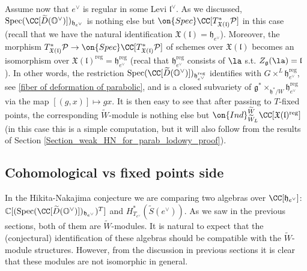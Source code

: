 \documentclass[12pt]{amsart}
\begin{document}
Assume now that $e^\vee$ is regular in some Levi $\mathfrak{l}^\vee$. As we discussed, $\operatorname{Spec}(\CC[\widetilde{D}(\mathbb{O}^\vee)])_{\mathfrak{h}_{e^\vee}}$ is nothing else but $\on{Spec}\CC[T^*_{\mathfrak{X}(\mathfrak{l})}\mathcal{P}]$ in this case (recall that we have the natural identification $\mathfrak{X}(\mathfrak{l})=\mathfrak{h}_{e^\vee}$). Moreover, the morphism $T^*_{\mathfrak{X}(\mathfrak{l})}\mathcal{P} \rightarrow \on{Spec}\CC[T^*_{\mathfrak{X}(\mathfrak{l})}\mathcal{P}]$ of schemes over $\mathfrak{X}(\mathfrak{l})$ becomes an isomorphism over $\mathfrak{X}(\mathfrak{l})^{\mathrm{reg}}=\mathfrak{h}_{e^\vee}^{\mathrm{reg}}$ (recal that $\mathfrak{h}_{e^\vee}^{\mathrm{reg}}$ consists of $\la$ s.t. $Z_{\mathfrak{g}}(\la)=\mathfrak{l}$). 
In other words, the restriction  $\operatorname{Spec}(\CC[\widetilde{D}(\mathbb{O}^\vee)])_{\mathfrak{h}_{e^\vee}^{\mathrm{reg}}}$ identifies with $G \times^L \mathfrak{h}_{e^\vee}^{\mathrm{reg}}$, see \cref{fiber of deformation of parabolic}, and is a closed subvariety of $\mathfrak{g}^* \times_{\mathfrak{h}^*/W} \mathfrak{h}_{e^\vee}^{\mathrm{reg}}$ via the map $[(g,x)] \mapsto gx$. It is then easy to see that after passing to $T$-fixed points, the corresponding $\widetilde{W}$-module is nothing else but $\on{Ind}_{\widetilde{W}_L}^{\widetilde{W}}\CC[\mathfrak{X}(\mathfrak{l})^{\mathrm{reg}}]$ (in this case this is a simple computation, but it will also follow from the results of Section \ref{Section_weak_HN_for_parab_lodowy_proof}).





\subsection{Cohomological vs fixed points side}
In the Hikita-Nakajima conjecture we are comparing two algebras over $\CC[\mathfrak{h}_{e^\vee}]$: $\mathbb{C}[(\operatorname{Spec}(\CC[\widetilde{D}(\mathbb{O}^\vee)])_{\mathfrak{h}_{e^\vee}})^{T}]$ and $H^*_{T_{e^\vee}}(\widetilde{S}(e^\vee))$. As we saw in the previous sections, both of them are $\widetilde{W}$-modules. It is natural to expect that the (conjectural) identification of these algebras should be compatible with the $\widetilde{W}$-module structures. However, from the discussion in previous sections it is clear that these modules are not isomorphic in general. 
\end{document}

